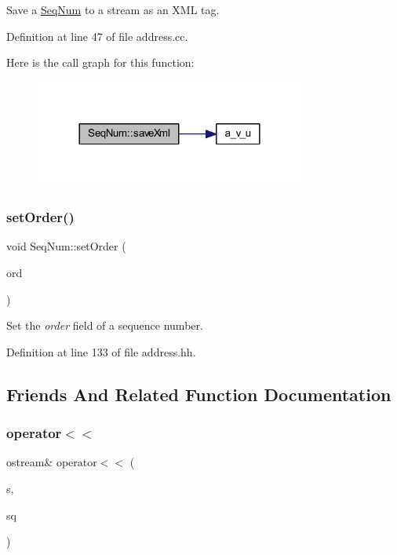 Save a \mbox{\hyperlink{class_seq_num}{Seq\+Num}} to a stream as an X\+ML tag. 



Definition at line 47 of file address.\+cc.

Here is the call graph for this function\+:
\nopagebreak
\begin{figure}[H]
\begin{center}
\leavevmode
\includegraphics[width=252pt]{class_seq_num_a31932b829fa851988806afa0d1002c24_cgraph}
\end{center}
\end{figure}
\mbox{\label{class_seq_num_ad9cd2238d891923c360c7e2df244197c}} 
\subsubsection{\texorpdfstring{setOrder()}{setOrder()}}
{\footnotesize\ttfamily void Seq\+Num\+::set\+Order (\begin{DoxyParamCaption}\item[{uintm}]{ord }\end{DoxyParamCaption})\hspace{0.3cm}{\ttfamily [inline]}}



Set the {\itshape order} field of a sequence number. 



Definition at line 133 of file address.\+hh.



\subsection{Friends And Related Function Documentation}
\mbox{\label{class_seq_num_a5c297423265bab5c45a78f81ba897152}} 
\subsubsection{\texorpdfstring{operator$<$$<$}{operator<<}}
{\footnotesize\ttfamily ostream\& operator$<$$<$ (\begin{DoxyParamCaption}\item[{ostream \&}]{s,  }\item[{const \mbox{\hyperlink{class_seq_num}{Seq\+Num}} \&}]{sq }\end{DoxyParamCaption})\hspace{0.3cm}{\ttfamily [friend]}}



